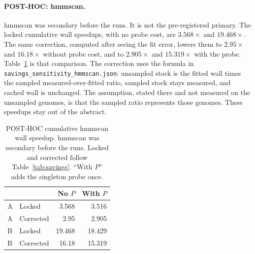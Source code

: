 \documentclass[letterpaper,twocolumn,10pt]{article}
\begin{document}
\paragraph{POST-HOC: hmmscan.}
hmmscan was secondary before the runs.
It is not the pre-registered primary.
The locked cumulative wall speedups, with no probe cost, are
$3.568\times$
and
$19.468\times$.
The same correction, computed after seeing the fit error, lowers them to
$2.95\times$
and
$16.18\times$
without probe cost, and to
$2.905\times$
and
$15.319\times$
with the probe.
Table~\ref{tab:hmmscan} is that comparison.
The correction uses the formula in \texttt{savings\_sensitivity\_hmmscan.json}: unsampled stock is the fitted wall times the sampled measured-over-fitted ratio, sampled stock stays measured, and cached wall is unchanged.
The assumption, stated there and not measured on the unsampled genomes, is that the sampled ratio represents those genomes.
These speedups stay out of the abstract.

\begin{table}[t]
\caption{POST-HOC cumulative hmmscan wall speedup.
hmmscan was secondary before the runs.
Locked and corrected follow Table~\ref{tab:savings}.
``With $P$'' adds the singleton probe once.}
\label{tab:hmmscan}
\small
\begin{tabular}{@{}llrr@{}}
\toprule
& & No $P$ & With $P$ \\
\midrule
A & Locked & 3.568 & 3.516 \\
A & Corrected & 2.95 & 2.905 \\
B & Locked & 19.468 & 18.429 \\
B & Corrected & 16.18 & 15.319 \\
\bottomrule
\end{tabular}
\end{table}
\end{document}

